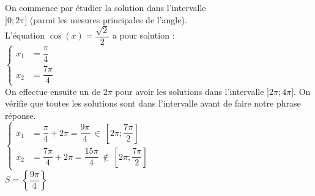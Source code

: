 \documentclass[11pt,a4paper]{article}  %
\begin{document}
\begin{enumMet}
	\begin{corrBox}
		On commence par étudier la solution dans l'intervalle\\ $]0;2\pi]$ (parmi les mesures principales de l'angle).\\
		L'équation $\cos(x)=\dfrac{\sqrt{2}}{2}$ a pour solution :\\
		$\begin{cases}
			x_1 &=\dfrac{\pi}{4}\\
			x_2 &=\dfrac{7\pi}{4}
		\end{cases}$\\
		On effectue ensuite un  de $2\pi$ pour avoir les solutions dans l'intervalle  $]2\pi;4\pi]$. On vérifie que toutes les solutions sont dans l'intervalle avant de faire notre phrase réponse.\\
		$\begin{cases}
			x_1 &=\dfrac{\pi}{4}+2\pi=\dfrac{9\pi}{4}  \ \in\ \left[2\pi;\dfrac{7\pi}{2}\right] \\
			x_2 &=\dfrac{7\pi}{4}+2\pi=\dfrac{15\pi}{4} \ \notin\ \left[2\pi;\dfrac{7\pi}{2}\right]
		\end{cases}$\\
		$S=\left\{\dfrac{9\pi}{4}\right\}$
	\end{corrBox}
\end{enumMet}
\end{document}
